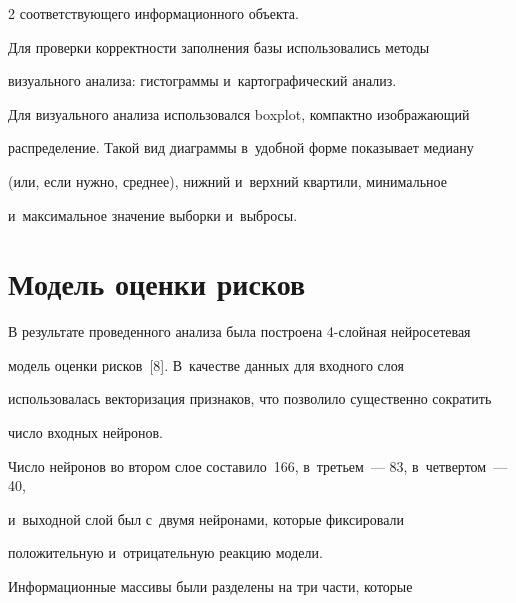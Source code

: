 \begin{multicols}{2}
соответствующего информационного объекта.


  


  Для проверки корректности заполнения базы использовались методы 


визуального анализа: гистограммы и~картографический анализ.


  


  Для визуального анализа использовался boxplot, компактно изображающий 


распределение. Такой вид диаграммы в~удобной форме показывает медиану 


(или, если нужно, среднее), нижний и~верхний квартили, минимальное 


и~максимальное значение выборки и~выбросы.





\vspace*{-6pt}


  


\section{Модель оценки рисков}





\vspace*{-4pt}





  В результате проведенного анализа была по\-строена 4-слой\-ная нейросетевая 


модель оценки рисков~[8]. В~качестве данных для входного слоя 


использовалась векторизация признаков, что позволило существенно сократить 


число входных нейронов.


  


  Число нейронов во втором слое составило~166, в~третьем~--- 83, в~четвертом~--- 40, 


и~выходной слой был с~двумя нейронами, которые фиксировали 


положительную и~отрицательную реакцию модели.


  


  Информационные массивы были разделены на три части, которые 



\end{multicols}

